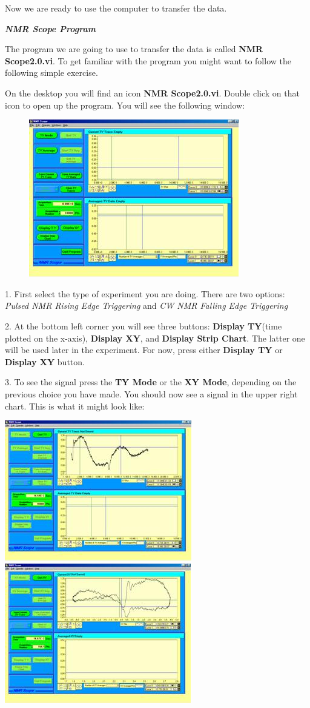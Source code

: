 \documentclass{../lab}
\begin{document}
Now we are ready to use the computer to transfer the data.

\emph{\textbf{NMR Scope Program}}

The program we are going to use to transfer the data is called \textbf{NMR Scope2.0.vi}. To get familiar with the program you might want to follow the following simple exercise.

On the desktop you will find an icon \textbf{NMR Scope2.0.vi}. Double click on that icon to open up the program. You will see the following window:


\begin{figure}[h]
    \centering
    \href{http://experimentationlab.berkeley.edu/sites/default/files/images/NMR35.jpg}{\includegraphics[width=0.5\linewidth]{images/NMR35.jpg}}
    \caption{}
    \label{fig:NMR35}
\end{figure}

1. First select the type of experiment you are doing. There are two options: \emph{Pulsed NMR Rising Edge Triggering} and \emph{CW NMR Falling Edge Triggering}

2. At the bottom left corner you will see three buttons: \textbf{Display TY}(time plotted on the x-axis), \textbf{Display XY}, and \textbf{Display Strip Chart}. The latter one will be used later in the experiment. For now, press either \textbf{Display TY} or \textbf{Display XY} button.

3. To see the signal press the \textbf{TY Mode} or the \textbf{XY Mode}, depending on the previous choice you have made. You should now see a signal in the upper right chart. This is what it might look like:

\noindent
\href{http://experimentationlab.berkeley.edu/sites/default/files/images/NMR36.jpg}{\includegraphics[width=0.33\linewidth,keepaspectratio]{images/NMR36.jpg}}
\href{http://experimentationlab.berkeley.edu/sites/default/files/images/NMR37.jpg}{\includegraphics[width=0.33\linewidth,keepaspectratio]{images/NMR37.jpg}}
\end{document}
